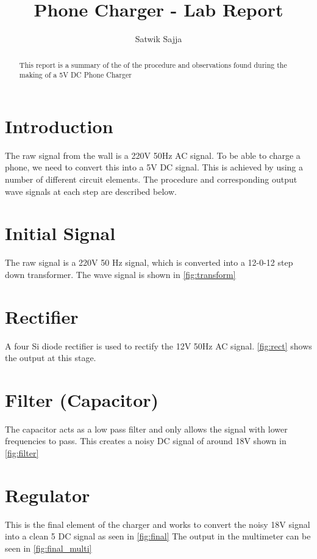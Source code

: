 \documentclass[journal,12pt,twocolumn]{IEEEtran}
\begin{document}
\title{ 
Phone Charger - Lab Report
}
\author{ Satwik Sajja }
\maketitle
\tableofcontents
\bigskip
\begin{abstract}
This report is a summary of the of the procedure and observations found during the making of a 5V DC Phone Charger
\end{abstract}

 \section{Introduction}
 The raw signal from the wall is a 220V 50Hz AC signal. To be able to charge a phone, we need to convert this into a 5V DC signal. 
 This is achieved by using a number of different circuit elements. The procedure and corresponding output wave signals at each step are described below.
 \section{Initial Signal}
 The raw signal is a 220V 50 Hz signal, which is converted into a 12-0-12 step down transformer. The wave signal is shown in \ref{fig:transform}
 \section{Rectifier}
 A four Si diode rectifier is used to rectify the 12V 50Hz AC signal. \ref{fig:rect} shows the output at this stage.
 \section{Filter (Capacitor)}
 The capacitor acts as a low pass filter and only allows the signal with lower frequencies to pass. This creates a noisy DC signal of around 18V shown in \ref{fig:filter}
 \section{Regulator}
This is the final element of the charger and works to convert the noisy 18V signal into a clean 5 DC signal as seen in \ref{fig:final}
The output in the multimeter can be seen in \ref{fig:final_multi}
\end{document}
